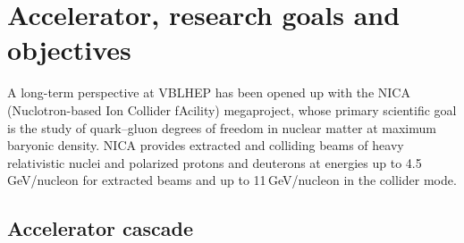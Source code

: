 \documentclass[12pt,a4paper]{article}
\begin{document}
\begin{abstract}
The article presents results of an analysis of a nuclear emulsion
exposed in March 2026 with an extracted beam of
\textsuperscript{124}Xe\textsuperscript{+54} ions at around 300\,MeV per
nucleon at the JINR Nuclotron. The primary objective was to determine
the beam profile and its uniformity, and to locate the Bragg peak
position for applied research in electronic components and radiation
biology. Three stacks of 8--10 emulsion layers of 60\,\si{\micro\meter}
thickness each poured onto a 2\,mm thick glass base measuring
$9\times12$\,cm\textsuperscript{2}, were exposed transversely to the
beam, allowing capture of the bulk of the beam and tracking of ion
deceleration until complete stop or the formation of long-range
fragments. Digital photography of approximately 80\% of each layer area
was performed using an intelligent microscope Olympus BX63, and the
frames were combined into a complete layer image using the microscope's
software. The high ionization of the ions made it sufficient to use a
4$\times$ objective lens to detect cross-sectional images of their
tracks. Counting and determination of the track parameters were
performed using ImageJ. A Gaussian Mixture Model on grain areas
resolves three particle classes corresponding to light fragments,
mid-mass fragments, and heavy residues including the primary beam.
The Bragg peak is observed at 8--10\,mm (Stack\,01) and 10--12\,mm (Stacks\,02/03) depth.
\end{abstract}

\newpage
\tableofcontents
\newpage

\section{Accelerator, research goals and objectives}
\label{sec:goals}

A long-term perspective at VBLHEP has been opened up with the NICA
(Nuclotron-based Ion Collider fAcility) megaproject, whose primary
scientific goal is the study of quark--gluon degrees of freedom in
nuclear matter at maximum baryonic density. NICA provides extracted
and colliding beams of heavy relativistic nuclei and polarized protons
and deuterons at energies up to 4.5\,GeV/nucleon for extracted beams
and up to 11\,GeV/nucleon in the collider mode.

\subsection{Accelerator cascade}
\end{document}
